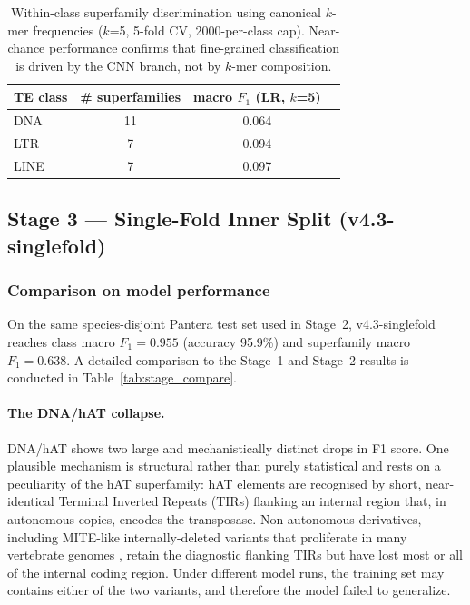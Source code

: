 \documentclass[12pt]{article}
\begin{document}
\begin{table}[h]
\centering
\caption{Within-class superfamily discrimination using canonical $k$-mer frequencies ($k$=5, 5-fold CV, 2000-per-class cap). Near-chance performance confirms that fine-grained classification is driven by the CNN branch, not by $k$-mer composition.}
\label{tab:kmer_within_class}
\begin{tabular}{lccc}
\toprule
TE class & \# superfamilies & macro $F_1$ (LR, $k$=5) \\
\midrule
DNA & 11 & 0.064 \\
LTR & 7  & 0.094 \\
LINE & 7 & 0.097 \\
\bottomrule
\end{tabular}
\end{table}

\FloatBarrier
\subsection{Stage 3 --- Single-Fold Inner Split (v4.3-singlefold)}\label{ssec:stage3}

\subsubsection{Comparison on model performance}

On the same species-disjoint Pantera test set used in Stage~2, v4.3-singlefold reaches class macro $F_1 = 0.955$ (accuracy 95.9\%) and superfamily macro $F_1 = 0.638$. A detailed comparison to the Stage~1 and Stage~2 results is conducted in Table~\ref{tab:stage_compare}. 

\paragraph{The DNA/hAT collapse.} DNA/hAT shows two large and mechanistically distinct drops in F1 score. One plausible mechanism is structural rather than purely statistical and rests on a peculiarity of the hAT superfamily: hAT elements are recognised by short, near-identical Terminal Inverted Repeats (TIRs) flanking an internal region that, in autonomous copies, encodes the transposase. Non-autonomous derivatives, including MITE-like internally-deleted variants that proliferate in many vertebrate genomes \cite{wells2020field}, retain the diagnostic flanking TIRs but have lost most or all of the internal coding region. Under different model runs, the training set may contains either of the two variants, and therefore the model failed to generalize. 
\end{document}
